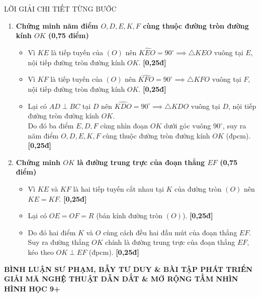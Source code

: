 \documentclass[11pt,a4paper]{article}
\begin{document}
\begin{solutionbox}{LỜI GIẢI CHI TIẾT TỪNG BƯỚC}
\begin{enumerate}[label=\textbf{\arabic*.}, leftmargin=*]
    \vspace{1mm}
    \item \textbf{Chứng minh năm điểm $O, D, E, K, F$ cùng thuộc đường tròn đường kính $OK$ (0,75 điểm)}
    \begin{itemize}[leftmargin=*, nosep]
        \item Vì $KE$ là tiếp tuyến của $(O)$ nên $\widehat{KEO} = 90^\circ \implies \triangle KEO$ vuông tại $E$, nội tiếp đường tròn đường kính $OK$. \hfill \textbf{[0,25đ]}
        \item Vì $KF$ là tiếp tuyến của $(O)$ nên $\widehat{KFO} = 90^\circ \implies \triangle KFO$ vuông tại $F$, nội tiếp đường tròn đường kính $OK$. \hfill \textbf{[0,25đ]}
        \item Lại có $AD \perp BC$ tại $D$ nên $\widehat{KDO} = 90^\circ \implies \triangle KDO$ vuông tại $D$, nội tiếp đường tròn đường kính $OK$.\\
        Do đó ba điểm $E, D, F$ cùng nhìn đoạn $OK$ dưới góc vuông $90^\circ$, suy ra năm điểm $O, D, E, K, F$ cùng thuộc đường tròn đường kính $OK$ (đpcm). \hfill \textbf{[0,25đ]}
    \end{itemize}

    \vspace{1mm}
    \item \textbf{Chứng minh $OK$ là đường trung trực của đoạn thẳng $EF$ (0,75 điểm)}
    \begin{itemize}[leftmargin=*, nosep]
        \item Vì $KE$ và $KF$ là hai tiếp tuyến cắt nhau tại $K$ của đường tròn $(O)$ nên $KE = KF$. \hfill \textbf{[0,25đ]}
        \item Lại có $OE = OF = R$ (bán kính đường tròn $(O)$). \hfill \textbf{[0,25đ]}
        \item Do đó hai điểm $K$ và $O$ cùng cách đều hai đầu mút của đoạn thẳng $EF$.\\
        Suy ra đường thẳng $OK$ chính là đường trung trực của đoạn thẳng $EF$, kéo theo $OK \perp EF$ (đpcm). \hfill \textbf{[0,25đ]}
    \end{itemize}
\end{enumerate}
\end{solutionbox}

\newpage

\begin{center}
    {\Large\bfseries\color{blue!80!black} BÌNH LUẬN SƯ PHẠM, BẪY TƯ DUY \& BÀI TẬP PHÁT TRIỂN}\\[1.5mm]
    {\large\bfseries GIẢI MÃ NGHỆ THUẬT DẪN DẮT \& MỞ RỘNG TẦM NHÌN HÌNH HỌC 9+}
\end{center}
\end{document}

